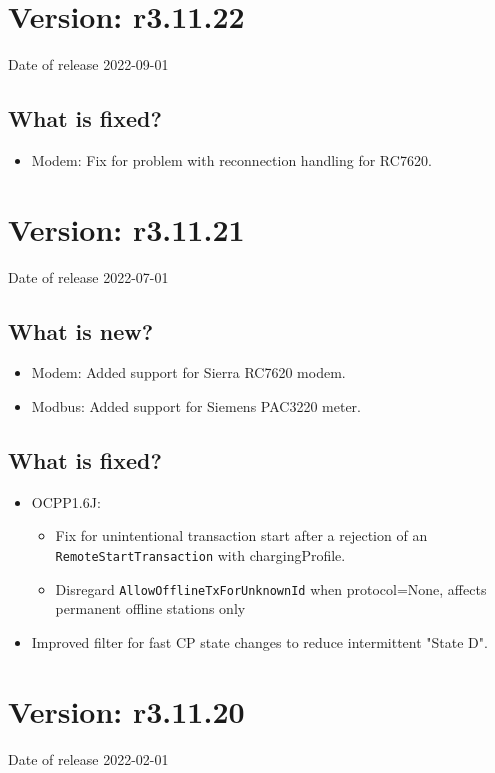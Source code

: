 \documentclass{scrartcl}
\begin{document}
\section{Version: r3.11.22}
Date of release 2022-09-01
\subsection*{What is fixed?}
\begin{itemize}
\item Modem: Fix for problem with reconnection handling for RC7620.
\end{itemize}

\section{Version: r3.11.21}
Date of release 2022-07-01
\subsection*{What is new?}
\begin{itemize}
\item Modem: Added support for Sierra RC7620 modem.
\item Modbus: Added support for Siemens PAC3220 meter.
\end{itemize}
\subsection*{What is fixed?}
\begin{itemize}
\item OCPP1.6J:
  \begin{itemize}
  \item Fix for unintentional transaction start after a rejection of an \verb|RemoteStartTransaction| with chargingProfile.
  \item Disregard \verb|AllowOfflineTxForUnknownId| when protocol=None, affects permanent offline stations only
  \end{itemize}
 \item Improved filter for fast CP state changes to reduce intermittent "State D".
\end{itemize}

\section{Version: r3.11.20}
Date of release 2022-02-01
\end{document}
